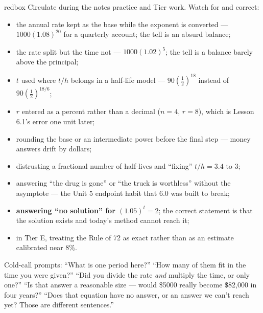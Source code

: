 \documentclass[10pt]{article}
\begin{document}
\begin{skillbox}{redbox}
Circulate during the notes practice and Tier work. Watch for and correct:
\begin{itemize}[leftmargin=1.2em, nosep]
  \item the annual rate kept as the base while the exponent is converted --- $1000(1.08)^{20}$ for a quarterly account; the tell is an absurd balance;
  \item the rate split but the time not --- $1000(1.02)^{5}$; the tell is a balance barely above the principal;
  \item $t$ used where $t/h$ belongs in a half-life model --- $90\left(\frac12\right)^{18}$ instead of $90\left(\frac12\right)^{18/6}$;
  \item $r$ entered as a percent rather than a decimal ($n=4$, $r=8$), which is Lesson 6.1's error one unit later;
  \item rounding the base or an intermediate power before the final step --- money answers drift by dollars;
  \item distrusting a fractional number of half-lives and ``fixing'' $t/h=3.4$ to $3$;
  \item answering ``the drug is gone'' or ``the truck is worthless'' without the asymptote --- the Unit 5 endpoint habit that 6.0 was built to break;
  \item \textbf{answering ``no solution'' for $(1.05)^{t}=2$}; the correct statement is that the solution exists and today's method cannot reach it;
  \item in Tier E, treating the Rule of 72 as exact rather than as an estimate calibrated near $8\%$.
\end{itemize}
Cold-call prompts: ``What is one period here?'' ``How many of them fit in the time you were given?''
``Did you divide the rate \emph{and} multiply the time, or only one?'' ``Is that answer a reasonable
size --- would \$5000 really become \$82{,}000 in four years?'' ``Does that equation have no answer, or
an answer we can't reach yet? Those are different sentences.''
\end{skillbox}
\end{document}
